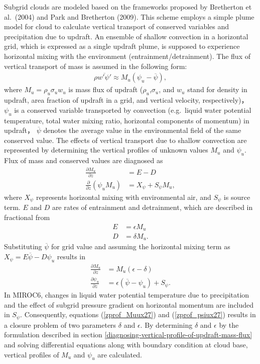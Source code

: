 Subgrid clouds are modeled based on the frameworks proposed by Bretherton et al.~(2004) and Park and Bretherton (2009). This scheme employs a simple plume model for cloud to calculate vertical
transport of conserved variables and precipitation due to updraft. An ensemble of shallow convection in a horizontal grid, which is expressed as a single updraft plume, is supposed to experience
horizontal mixing with the environment (entrainment/detrainment). The flux of vertical transport of mass is assumed in the following form: \begin{eqnarray}\label{def_Mu}
    \rho \overline {w' \psi '}\approx M_u (\psi_u-\overline{\psi}) ,\end{eqnarray} where \(M_u=\rho_u\sigma_u w_u\) is mass flux of updraft (\(\rho_u\),\(\sigma_u\), and \(w_u\) stand for density in updraft, area
fraction of updraft in a grid, and vertical velocity, respectively)， \(\psi_u\) is a conserved variable transported by convection (e.g.~liquid water potential temperature, total water mixing ratio,
horizontal components of momentum) in updraft， \(\overline{\psi}\) denotes the average value in the environmental field of the same conserved value. The effects of vertical transport due to shallow
convection are represented by determining the vertical profiles of unknown values \(M_u\) and \(\psi_u\). Flux of mass and conserved values are diagnosed as \begin{eqnarray}
    \frac{\partial M_u}{\partial z} &= E - D \label{zprof_Mu}\\
    \frac{\partial}{\partial z} (\psi_u M_u) &= X_\psi + S_\psi M_u,\label{zprof_psi}\end{eqnarray} where \(X_\psi\) represents horizontal mixing with environmental air, and \(S_\psi\) is source term. \(E\) and
\(D\) are rates of entrainment and detrainment, which are described in fractional from \begin{eqnarray}
    E &=\epsilon M_u \label{fracE}\\
    D &=\delta M_u. \label{fracD}\end{eqnarray} Substituting \(\overline{\psi}\) for grid value and assuming the horizontal mixing term as \(X_{\psi}=E \overline{\psi} - D\psi_u\) results in \begin{eqnarray}
    \frac{\partial M_u}{\partial z} &= M_u (\epsilon - \delta) \label{zprof_Mu'}\\
    \frac{\partial \psi_u}{\partial z} &= \epsilon(\overline{\psi} - \psi_u) + S_{\psi}. \label{zprof_psi'}\end{eqnarray} In MIROC6, changes in liquid water potential temperature due to precipitation and the
effect of subgrid pressure gradient on horizontal momentum are included in \(S_{\psi}\). Consequently, equations (\ref{zprof_Muux27}{}) and (\ref{zprof_psiux27}) results
in a closure problem of two parameters \(\delta\) and \(\epsilon\). By determining \(\delta\) and \(\epsilon\) by the formulation described in section
\ref{diagnosing-vertical-profile-of-updraft-mass-flux} and solving differential equations along with boundary condition at cloud base, vertical profiles of \(M_u\) and \(\psi_u\) are
calculated.


